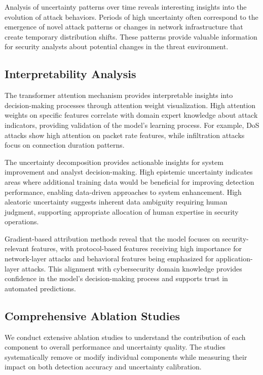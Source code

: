 \documentclass[journal]{IEEEtran}
\begin{document}
Analysis of uncertainty patterns over time reveals interesting insights into the evolution of attack behaviors. Periods of high uncertainty often correspond to the emergence of novel attack patterns or changes in network infrastructure that create temporary distribution shifts. These patterns provide valuable information for security analysts about potential changes in the threat environment.

\subsection{Interpretability Analysis}

The transformer attention mechanism provides interpretable insights into decision-making processes through attention weight visualization. High attention weights on specific features correlate with domain expert knowledge about attack indicators, providing validation of the model's learning process. For example, DoS attacks show high attention on packet rate features, while infiltration attacks focus on connection duration patterns.

The uncertainty decomposition provides actionable insights for system improvement and analyst decision-making. High epistemic uncertainty indicates areas where additional training data would be beneficial for improving detection performance, enabling data-driven approaches to system enhancement. High aleatoric uncertainty suggests inherent data ambiguity requiring human judgment, supporting appropriate allocation of human expertise in security operations.

Gradient-based attribution methods reveal that the model focuses on security-relevant features, with protocol-based features receiving high importance for network-layer attacks and behavioral features being emphasized for application-layer attacks. This alignment with cybersecurity domain knowledge provides confidence in the model's decision-making process and supports trust in automated predictions.

\subsection{Comprehensive Ablation Studies}

We conduct extensive ablation studies to understand the contribution of each component to overall performance and uncertainty quality. The studies systematically remove or modify individual components while measuring their impact on both detection accuracy and uncertainty calibration.
\end{document}
